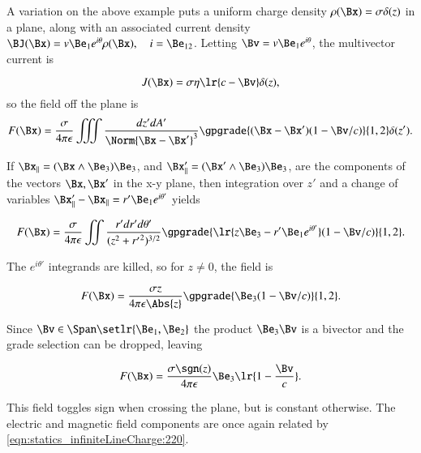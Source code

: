 %
%
A variation on the above example puts a uniform charge density \( \rho(\Bx) = \sigma \delta(z) \) in a plane, along with an associated current density \( \BJ(\Bx) = v \Be_1 e^{i\theta} \rho(\Bx), \quad i = \Be_{12} \).  Letting \( \Bv = v \Be_1 e^{i\theta} \), the multivector current is

\begin{dmath}\label{eqn:statics_infinitePlane:240}
J(\Bx) = \sigma \eta \lr{ c - \Bv } \delta(z),
\end{dmath}
so the field off the plane is
\begin{dmath}\label{eqn:statics_infinitePlane:260}
F(\Bx)
=
\frac{\sigma}{4 \pi \epsilon } \iiint \frac{dz' dA'}{ \Norm{ \Bx - \Bx' }^3 }
\gpgrade{ (\Bx - \Bx') (1 - \Bv/c) }{1,2} \delta(z').
\end{dmath}

If \( \Bx_\parallel = (\Bx \wedge \Be_3) \Be_3 \), and \( \Bx'_\parallel = (\Bx' \wedge \Be_3) \Be_3 \), are the components of the vectors \( \Bx, \Bx' \) in the x-y plane, then integration over \( z' \) and a change of variables \( \Bx'_\parallel - \Bx_\parallel = r' \Be_1 e^{i \theta'} \) yields

\begin{dmath}\label{eqn:statics_infinitePlane:280}
F(\Bx)
=
\frac{\sigma}{4 \pi \epsilon } \iint \frac{r' dr' d\theta'}{ ( z^2 + {r'}^2 )^{3/2} }
\gpgrade{ \lr{ z \Be_3 - r' \Be_1 e^{i\theta'} } (1 - \Bv/c) }{1,2}.
\end{dmath}

The \( e^{i\theta'} \) integrands are killed, so for \( z \ne 0 \), the field is

\begin{dmath}\label{eqn:statics_infinitePlane:300}
F(\Bx)
=
\frac{\sigma z}{4 \pi \epsilon \Abs{z} } \gpgrade{ \Be_3 (1 - \Bv/c) }{1,2}.
\end{dmath}

Since \( \Bv \in \Span \setlr{ \Be_1, \Be_2 } \) the product \( \Be_3 \Bv \) is a bivector and the grade selection can be dropped, leaving

\begin{dmath}\label{eqn:statics_infinitePlane:320}
F(\Bx)
=
\frac{\sigma \sgn(z)}{4 \pi \epsilon } \Be_3 \lr{ 1 - \frac{\Bv}{c}}.
\end{dmath}

This field toggles sign when crossing the plane, but is constant otherwise.  The electric and magnetic field components are once again related by \cref{eqn:statics_infiniteLineCharge:220}.


